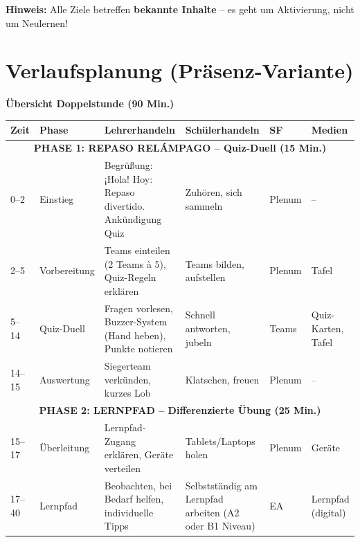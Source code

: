 \documentclass[11pt,a4paper]{article}
\begin{document}
\vspace{1em}
\textbf{Hinweis:} Alle Ziele betreffen \textbf{bekannte Inhalte} -- es geht um Aktivierung, nicht um Neulernen!

\section{Verlaufsplanung (Präsenz-Variante)}

\textbf{Übersicht Doppelstunde (90 Min.)}

\begin{longtable}{|p{0.8cm}|p{1.5cm}|p{4cm}|p{3cm}|p{1.5cm}|p{2cm}|}
\hline
\textbf{Zeit} & \textbf{Phase} & \textbf{Lehrerhandeln} & \textbf{Schülerhandeln} & \textbf{SF} & \textbf{Medien} \\
\hline
\endhead

\multicolumn{6}{|c|}{\textbf{PHASE 1: REPASO RELÁMPAGO -- Quiz-Duell (15 Min.)}} \\
\hline

0--2 & Einstieg & Begrüßung: \glqq{}¡Hola! Hoy: Repaso divertido.\grqq{} Ankündigung Quiz & Zuhören, sich sammeln & Plenum & -- \\
\hline

2--5 & Vorbereitung & Teams einteilen (2 Teams à 5), Quiz-Regeln erklären & Teams bilden, aufstellen & Plenum & Tafel \\
\hline

5--14 & Quiz-Duell & Fragen vorlesen, Buzzer-System (Hand heben), Punkte notieren & Schnell antworten, jubeln & Teams & Quiz-Karten, Tafel \\
\hline

14--15 & Auswertung & Siegerteam verkünden, kurzes Lob & Klatschen, freuen & Plenum & -- \\
\hline

\multicolumn{6}{|c|}{\textbf{PHASE 2: LERNPFAD -- Differenzierte Übung (25 Min.)}} \\
\hline

15--17 & Überleitung & Lernpfad-Zugang erklären, Geräte verteilen & Tablets/Laptops holen & Plenum & Geräte \\
\hline

17--40 & Lernpfad & Beobachten, bei Bedarf helfen, individuelle Tipps & Selbstständig am Lernpfad arbeiten (A2 oder B1 Niveau) & EA & Lernpfad (digital) \\
\hline


\end{longtable}
\end{document}
